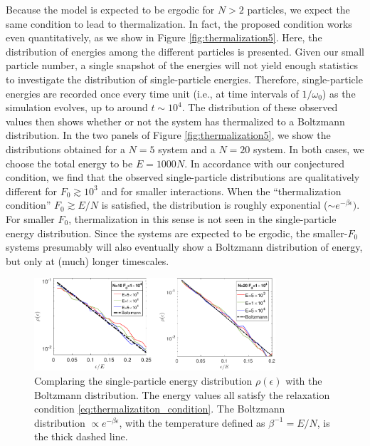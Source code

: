 \documentclass[a4paper, onecolumn]{revtex4-1}
\begin{document}
Because the model is expected to be ergodic for $N>2$ particles, we expect the same condition to
lead to thermalization.  In fact, the proposed condition works even quantitatively, as we show in
Figure \ref{fig:thermalization5}.  Here, the distribution of energies among the different particles
is presented.  Given our small particle number, a single snapshot of the energies will not yield
enough statistics to investigate the distribution of single-particle energies.  Therefore,
single-particle energies are recorded once every time unit (i.e., at time intervals of $1/\omega_0$)
as the simulation evolves, up to around $t\sim10^4$.  The distribution of these observed values then
shows whether or not the system has thermalized to a Boltzmann distribution.  In the two panels of
Figure \ref{fig:thermalization5}, we show the distributions obtained for a $N=5$ system and a $N=20$
system.  In both cases, we choose the total energy to be $E=1000N$.  In accordance with our
conjectured condition, we find that the observed single-particle distributions are qualitatively
different for $F_0\gtrsim10^3$ and for smaller interactions.  When the ``thermalization condition''
$F_0\gtrsim E/N$ is satisfied, the distribution is roughly exponential ($\sim e^{-\beta\epsilon})$.
For smaller $F_0$, thermalization in this sense is not seen in the single-particle energy
distribution.  Since the systems are expected to be ergodic, the smaller-$F_0$ systems presumably
will also eventually show a Boltzmann distribution of energy, but only at (much) longer timescales.



\begin{figure}[tb]
\includegraphics[width=0.8\textwidth]{ZhiyuPictures/Boltzmann_log_2panels_01-crop.pdf}
%
\caption{\label{fig:thermalization9} Complaring the single-particle energy distribution
  $\rho(\epsilon)$ with the Boltzmann distribution.  The energy values all satisfy the relaxation
  condition \eqref{eq:thermalizatiton_condition}.  The Boltzmann distribution $\propto
  e^{-\beta\epsilon}$, with the temperature defined as $\beta^{-1}= E/N$, is the thick dashed line.}
\end{figure}
\end{document}
